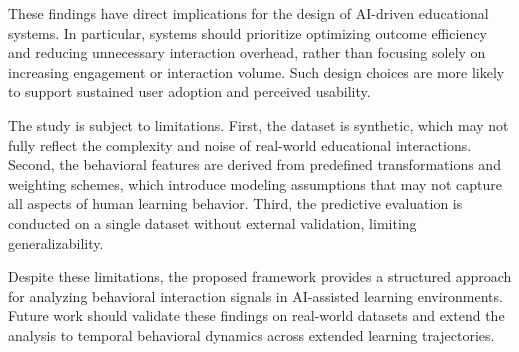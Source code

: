 \documentclass{article}
\begin{document}
These findings have direct implications for the design of AI-driven educational systems. In particular, systems should prioritize optimizing outcome efficiency and reducing unnecessary interaction overhead, rather than focusing solely on increasing engagement or interaction volume. Such design choices are more likely to support sustained user adoption and perceived usability.

The study is subject to limitations. First, the dataset is synthetic, which may not fully reflect the complexity and noise of real-world educational interactions. Second, the behavioral features are derived from predefined transformations and weighting schemes, which introduce modeling assumptions that may not capture all aspects of human learning behavior. Third, the predictive evaluation is conducted on a single dataset without external validation, limiting generalizability.

Despite these limitations, the proposed framework provides a structured approach for analyzing behavioral interaction signals in AI-assisted learning environments. Future work should validate these findings on real-world datasets and extend the analysis to temporal behavioral dynamics across extended learning trajectories.



\end{document}
